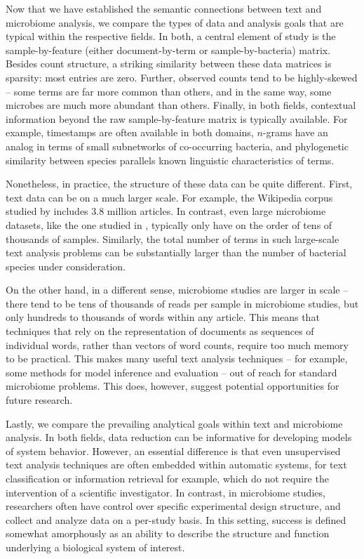 Now that we have established the semantic connections between text and
microbiome analysis, we compare the types of data and analysis goals that are
typical within the respective fields. In both, a central element of study is the
sample-by-feature (either document-by-term or sample-by-bacteria) matrix.
Besides count structure, a striking similarity between these data matrices is
sparsity: most entries are zero. Further, observed counts tend to be
highly-skewed -- some terms are far more common than others, and in the same
way, some microbes are much more abundant than others. Finally, in both fields,
contextual information beyond the raw sample-by-feature matrix is typically
available. For example, timestamps are often available in both domains,
$n$-grams have an analog in terms of small subnetworks of co-occurring bacteria,
and phylogenetic similarity between species parallels known linguistic
characteristics of terms.

Nonetheless, in practice, the structure of these data can be quite different.
First, text data can be on a much larger scale. For example, the Wikipedia
corpus studied by \cite{hoffman2013stochastic} includes 3.8 million articles. In
contrast, even large microbiome datasets, like the one studied in
\citep{gilbert2014earth}, typically only have on the order of tens of thousands
of samples. Similarly, the total number of terms in such large-scale text
analysis problems can be substantially larger than the number of bacterial
species under consideration.

On the other hand, in a different sense, microbiome studies are larger in scale
-- there tend to be tens of thousands of reads per sample in microbiome studies,
but only hundreds to thousands of words within any article. This means that
techniques that rely on the representation of documents as sequences of
individual words, rather than vectors of word counts, require too much memory to
be practical. This makes many useful text analysis techniques -- for example,
some methods for model inference and evaluation \citep{wallach2009evaluation} --
out of reach for standard microbiome problems. This does, however, suggest
potential opportunities for future research.

Lastly, we compare the prevailing analytical goals within text and microbiome
analysis. In both fields, data reduction can be informative for developing
models of system behavior. However, an essential difference is that even
unsupervised text analysis techniques are often embedded within automatic
systems, for text classification or information retrieval for example, which do
not require the intervention of a scientific investigator. In contrast, in
microbiome studies, researchers often have control over specific experimental
design structure, and collect and analyze data on a per-study basis. In this
setting, success is defined somewhat amorphously as an ability to describe the
structure and function underlying a biological system of interest.

